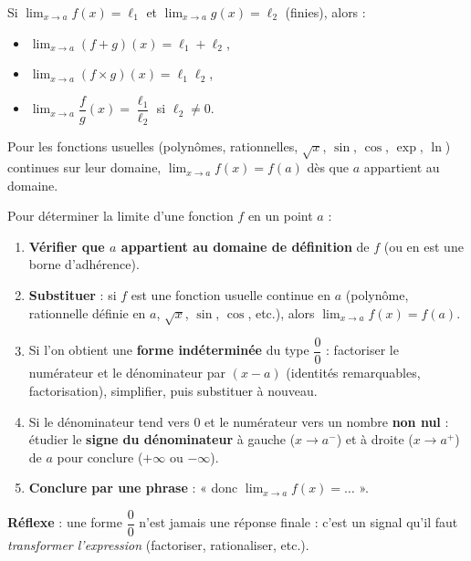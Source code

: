 \documentclass[11pt]{article}
\newcommand{\cle}[1]{{\popxbold\color{popdark}#1}}
\begin{document}
\begin{propriete}
Si $\lim_{x\to a} f(x) = \ell_1$ et $\lim_{x\to a} g(x) = \ell_2$ (finies), alors :
\begin{itemize}
\item $\lim_{x\to a} (f+g)(x) = \ell_1 + \ell_2$,
\item $\lim_{x\to a} (f \times g)(x) = \ell_1 \ell_2$,
\item $\lim_{x\to a} \dfrac{f}{g}(x) = \dfrac{\ell_1}{\ell_2}$ si $\ell_2 \neq 0$.
\end{itemize}
Pour les fonctions usuelles (polynômes, rationnelles, $\sqrt{x}$, $\sin$, $\cos$, $\exp$, $\ln$) \cle{continues sur leur domaine}, $\lim_{x\to a} f(x) = f(a)$ dès que $a$ appartient au domaine.
\end{propriete}

\begin{methode}
Pour déterminer la limite d'une fonction $f$ en un point $a$ :
\begin{enumerate}
\item \textbf{Vérifier que $a$ appartient au domaine de définition} de $f$ (ou en est une borne d'adhérence).
\item \textbf{Substituer} : si $f$ est une fonction usuelle continue en $a$ (polynôme, rationnelle définie en $a$, $\sqrt{x}$, $\sin$, $\cos$, etc.), alors $\lim_{x\to a} f(x) = f(a)$.
\item Si l'on obtient une \textbf{forme indéterminée} du type $\dfrac{0}{0}$ : factoriser le numérateur et le dénominateur par $(x-a)$ (identités remarquables, factorisation), simplifier, puis substituer à nouveau.
\item Si le dénominateur tend vers $0$ et le numérateur vers un nombre \textbf{non nul} : étudier le \textbf{signe du dénominateur} à gauche ($x \to a^-$) et à droite ($x \to a^+$) de $a$ pour conclure ($+\infty$ ou $-\infty$).
\item \textbf{Conclure par une phrase} : « donc $\lim_{x\to a} f(x) = \ldots$ ».
\end{enumerate}
\textbf{Réflexe} : une forme $\dfrac{0}{0}$ n'est jamais une réponse finale : c'est un signal qu'il faut \emph{transformer l'expression} (factoriser, rationaliser, etc.).
\end{methode}
\end{document}

